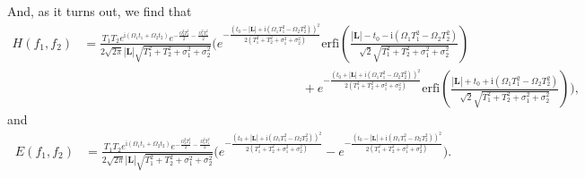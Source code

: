 \documentclass[letterpaper,12pt,titlepage,oneside,final]{book}
\newcommand{\ii}{\mathrm{i}}
\begin{document}
And, as it turns out, we find that{\footnotesize
\begin{align}
    H(f_1,f_2) &= \frac{T_1T_2e^{\ii (\Omega_1 t_1+\Omega_2 t_2)}e^{- \frac{\Omega_2^2 T_2^2}{2} - \frac{\Omega_1^2 T_1^2}{2}}}{2\sqrt{2\pi}|\bm L|\sqrt{T_1^2 + T_2^2 + \sigma_1^2 + \sigma_2^2}} \Bigg(e^{- \frac{(t_0 - |\bm L|+\ii (\Omega_1 T_1^2- \Omega_2 T_2^2))^2}{2(T_1^2 + T_2^2 + \sigma_1^2 + \sigma_2^2)}}\text{erfi}\left(\frac{|\bm L|-t_0-\ii (\Omega_1 T_1^2- \Omega_2 T_2^2)}{\sqrt{2}\sqrt{T_1^2 + T_2^2 + \sigma_1^2 + \sigma_2^2}}\right)\\
     &\:\:\:\:\:\:\:\:\:\:\:\:\:\:\:\:\:\:\:\:\:\:\:\:\:\:\:\:\:\:\:\:\:\:\:\:\:\:\:\:\:\:\:\:\:\:\:\:\:\:\:\:\:\:\:\:\:\:\:\:\:\:\:\:\:\:\:\:\:\:\:\:\:\:\:\:\:\:\:+e^{- \frac{(t_0 + |\bm L|+\ii (\Omega_1 T_1^2- \Omega_2 T_2^2))^2}{2(T_1^2 + T_2^2 + \sigma_1^2 + \sigma_2^2)}}\text{erfi}\left(\frac{|\bm L|+t_0+\ii (\Omega_1 T_1^2- \Omega_2 T_2^2)}{\sqrt{2}\sqrt{T_1^2 + T_2^2 + \sigma_1^2 + \sigma_2^2}}\right)\Bigg),\label{eq:Hbig}\nonumber
\end{align}}
and
\begin{align}
    E(f_1,f_2) &= \frac{T_1T_2e^{\ii (\Omega_1 t_1+\Omega_2 t_2)}e^{- \frac{\Omega_2^2 T_2^2}{2} - \frac{\Omega_1^2 T_1^2}{2}}}{2\sqrt{2\pi}|\bm L|\sqrt{T_1^2 + T_2^2 + \sigma_1^2 + \sigma_2^2}} \Bigg(e^{- \frac{(t_0 + |\bm L|+\ii (\Omega_1 T_1^2- \Omega_2 T_2^2))^2}{2(T_1^2 + T_2^2 + \sigma_1^2 + \sigma_2^2)}}-e^{- \frac{(t_0 - |\bm L|+\ii (\Omega_1 T_1^2- \Omega_2 T_2^2))^2}{2(T_1^2 + T_2^2 + \sigma_1^2 + \sigma_2^2)}}\Bigg).
\end{align}
\end{document}
